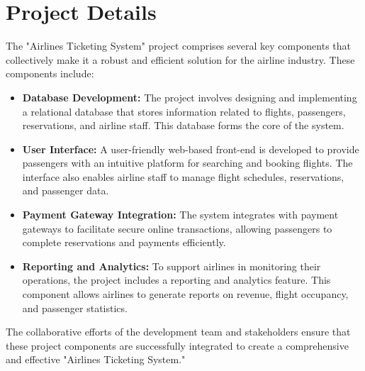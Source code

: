 \section{Project Details}
The "Airlines Ticketing System" project comprises several key components that collectively make it a robust and efficient solution for the airline industry. These components include:

\begin{itemize}
    \item \textbf{Database Development:} The project involves designing and implementing a relational database that stores information related to flights, passengers, reservations, and airline staff. This database forms the core of the system.

    \item \textbf{User Interface:} A user-friendly web-based front-end is developed to provide passengers with an intuitive platform for searching and booking flights. The interface also enables airline staff to manage flight schedules, reservations, and passenger data.

    \item \textbf{Payment Gateway Integration:} The system integrates with payment gateways to facilitate secure online transactions, allowing passengers to complete reservations and payments efficiently.

    \item \textbf{Reporting and Analytics:} To support airlines in monitoring their operations, the project includes a reporting and analytics feature. This component allows airlines to generate reports on revenue, flight occupancy, and passenger statistics.

\end{itemize}

The collaborative efforts of the development team and stakeholders ensure that these project components are successfully integrated to create a comprehensive and effective "Airlines Ticketing System."


\clearpage
